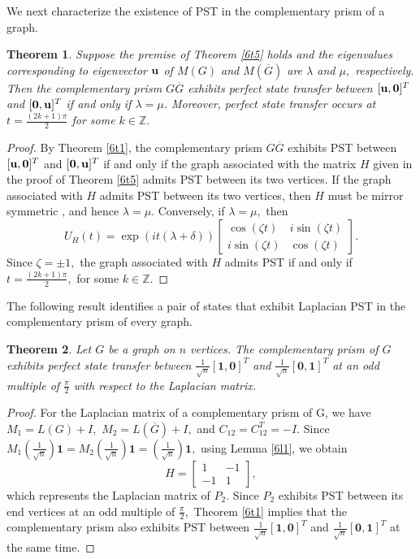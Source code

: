 \documentclass[12pt,a4paper]{article}
\newtheorem{thm}{Theorem}
\def \u {{\bf u}}
\newcommand{\ob}[1]{\left(#1\right)}
\begin{document}
We next characterize the existence of PST in the complementary prism of a graph.
\begin{thm}\label{6t7} 
Suppose the premise of Theorem \ref{6t5} holds and the eigenvalues corresponding to eigenvector $\u$ of $M(G)$ and $M(\overline{G})$ are $\lambda$ and $\mu,$ respectively.
Then the complementary prism $G\overline{G}$ exhibits perfect state transfer between
$[\u,
\mathbf{0}]^T$ and
$[\mathbf{0},\u]^T$
if and only if $\lambda=\mu$. Moreover, perfect state transfer occurs at $
t=\frac{(2k+1)\pi}{2}$ for some $k\in \mathbb{Z}.$
\end{thm}

\begin{proof}
    By Theorem \ref{6t1}, the complementary prism $G\overline{G}$ exhibits PST between $[\u,
\mathbf{0}]^T$ and
$[\mathbf{0},\u]^T$ if and only if the graph associated with the matrix $H$ given in the proof of Theorem \ref{6t5} admits PST between its two vertices. If the graph associated with $H$ admits PST between its two vertices, then $H$ must be mirror symmetric \cite[Lemma 2]{kay}, and hence $\lambda=\mu.$ Conversely, if $\lambda=\mu,$ then 
\[
U_H(t)
=
\exp{\ob{it\ob{\lambda+\delta}}}
\begin{bmatrix}
\cos(\zeta t) & i\sin(\zeta t)
\\
i\sin(\zeta t)
& \cos(\zeta t)
\end{bmatrix}.
\]
Since $\zeta=\pm 1,$ the graph associated with $H$ admits PST if and only if $t=\frac{(2k+1)\pi}{2},$ for some $k\in\mathbb{Z}.$
\end{proof}

The following result identifies a pair of states that exhibit Laplacian PST in the complementary prism of every graph.
\begin{thm}\label{5t4}
     Let $G$ be a graph on $n$ vertices. The complementary prism of $G$ exhibits perfect state transfer between $\frac{1}{\sqrt{n}}[\mathbf{1},\mathbf{0}]^T$ and $\frac{1}{\sqrt{n}}[\mathbf{0},\mathbf{1}]^T$ at an odd multiple of $\frac{\pi}{2}$ with respect to the Laplacian matrix.
\end{thm}
\begin{proof}
    For the Laplacian matrix of a complementary prism of G, we have $M_1=L(G)+I,$ $M_2=L(\overline{G})+I,$ and $C_{12}=C_{12}^T=-I.$ Since $M_1\ob{\frac{1}{\sqrt{n}}}\mathbf{1}=M_2\ob{\frac{1}{\sqrt{n}}}\mathbf{1}=\ob{\frac{1}{\sqrt{n}}}\mathbf{1},$ using Lemma \ref{6l1}, we obtain \[H=\begin{bmatrix}
    1 & -1\\
    -1 & 1
    \end{bmatrix},
    \] which represents the Laplacian matrix of $P_2.$ Since $P_2$ exhibits PST between its end vertices at an odd multiple of $\frac{\pi}{2},$  Theorem \ref{6t1} implies that the complementary prism also exhibits PST between $\frac{1}{\sqrt{n}}[\mathbf{1},\mathbf{0}]^T$ and $\frac{1}{\sqrt{n}}[\mathbf{0},\mathbf{1}]^T$ at the same time. 
\end{proof}
\end{document}

